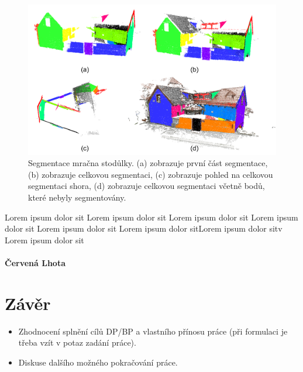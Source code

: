 \documentclass[11pt,twoside,a4paper]{book}
\begin{document}
\begin{figure}[H]
\begin{center}
\includegraphics[width=\textwidth]{figures/test-st}
\caption{Segmentace mračna stodůlky. (a) zobrazuje první část segmentace, (b) zobrazuje celkovou segmentaci, (c) zobrazuje pohled na celkovou segmentaci shora, (d) zobrazuje celkovou segmentaci včetně bodů, které nebyly segmentovány.}
\label{fig:test-st}
\end{center}
\end{figure}

Lorem ipsum dolor sit Lorem ipsum dolor sit Lorem ipsum dolor sit Lorem ipsum dolor sit Lorem ipsum dolor sit Lorem ipsum dolor sitLorem ipsum dolor sitv Lorem ipsum dolor sit

\newpage
\subsubsection{Červená Lhota}



\chapter{Závěr}

\begin{itemize}
\item Zhodnocení splnění cílů DP/BP a  vlastního přínosu práce (při formulaci je třeba vzít v potaz zadání práce).
\item Diskuse dalšího možného pokračování práce.
\end{itemize} 

\end{document}
